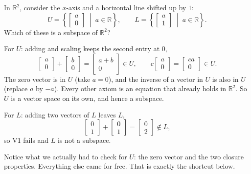 \begin{example}
In $\mathbb{R}^2$, consider the $x$-axis and a horizontal line shifted up by $1$:
\[
U = \left\{ \begin{bmatrix} a \\ 0 \end{bmatrix} \;\middle|\; a \in \mathbb{R} \right\},
\qquad
L = \left\{ \begin{bmatrix} a \\ 1 \end{bmatrix} \;\middle|\; a \in \mathbb{R} \right\}.
\]
Which of these is a subspace of $\mathbb{R}^2$?

\begin{solution}
For $U$: adding and scaling keeps the second entry at $0$,
\[
\begin{bmatrix} a \\ 0 \end{bmatrix} + \begin{bmatrix} b \\ 0 \end{bmatrix} = \begin{bmatrix} a + b \\ 0 \end{bmatrix} \in U,
\qquad
c\begin{bmatrix} a \\ 0 \end{bmatrix} = \begin{bmatrix} ca \\ 0 \end{bmatrix} \in U.
\]
The zero vector is in $U$ (take $a = 0$), and the inverse of a vector in $U$ is also in $U$ (replace $a$ by $-a$). Every other axiom is an equation that already holds in $\mathbb{R}^2$. So $U$ is a vector space on its own, and hence a subspace.

For $L$: adding two vectors of $L$ leaves $L$,
\[
\begin{bmatrix} 0 \\ 1 \end{bmatrix} + \begin{bmatrix} 0 \\ 1 \end{bmatrix} = \begin{bmatrix} 0 \\ 2 \end{bmatrix} \notin L,
\]
so V1 fails and $L$ is not a subspace.

Notice what we actually had to check for $U$: the zero vector and the two closure properties. Everything else came for free. That is exactly the shortcut below.
\end{solution}
\end{example}

